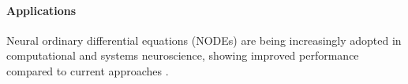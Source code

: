 \documentclass{article}
\theoremstyle{definition} \newtheorem{definition}{Definition}  \newtheorem{example}{Example}
\theoremstyle{remark} \newtheorem{remark}{Remark}
\newcounter{ct}
\newcommand{\Diff}{\operatorname{Diff}}
\begin{document}




\paragraph{Applications}
Neural ordinary differential equations (NODEs) are being increasingly adopted in computational and systems neuroscience, showing improved performance compared to current approaches \citep{kim2021inferring,geenjaar2023learning,sedler2023expressive,elgazzar2024universal,rubanova2019latent,coelho2024enhancing}.









%
%
%
\end{document}
